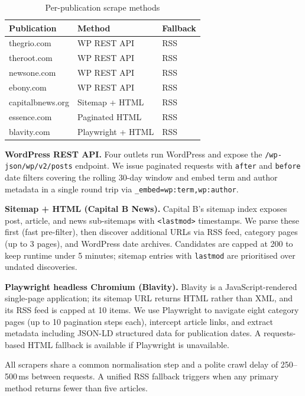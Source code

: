 \documentclass[sigconf,anonymous]{acmart}
\begin{document}
\begin{table}[h]
\caption{Per-publication scrape methods}
\label{tab:sources}
\small
\begin{tabular}{lll}
\toprule
\textbf{Publication} & \textbf{Method} & \textbf{Fallback} \\
\midrule
thegrio.com      & WP REST API       & RSS  \\
theroot.com      & WP REST API       & RSS  \\
newsone.com      & WP REST API       & RSS  \\
ebony.com        & WP REST API       & RSS  \\
capitalbnews.org & Sitemap + HTML    & RSS  \\
essence.com      & Paginated HTML    & RSS  \\
blavity.com      & Playwright + HTML & RSS  \\
\bottomrule
\end{tabular}
\end{table}

\noindent\textbf{WordPress REST API.}
Four outlets run WordPress and expose the \texttt{/wp-json/wp/v2/posts}
endpoint.
We issue paginated requests with \texttt{after} and \texttt{before} date
filters covering the rolling 30-day window and embed term and author metadata
in a single round trip via \texttt{\_embed=wp:term,wp:author}.

\noindent\textbf{Sitemap + HTML (Capital B News).}
Capital B's sitemap index exposes post, article, and news sub-sitemaps with
\texttt{<lastmod>} timestamps.
We parse these first (fast pre-filter), then discover additional URLs via RSS
feed, category pages (up to 3 pages), and WordPress date archives.
Candidates are capped at 200 to keep runtime under 5 minutes; sitemap entries
with \texttt{lastmod} are prioritised over undated discoveries.

\noindent\textbf{Playwright headless Chromium (Blavity).}
Blavity is a JavaScript-rendered single-page application; its sitemap URL
returns HTML rather than XML, and its RSS feed is capped at 10 items.
We use Playwright to navigate eight category pages (up to 10 pagination steps
each), intercept article links, and extract metadata including JSON-LD
structured data for publication dates.
A requests-based HTML fallback is available if Playwright is unavailable.

All scrapers share a common normalisation step and a polite crawl delay of
250--500\,ms between requests.
A unified RSS fallback triggers when any primary method returns fewer than
five articles.
\end{document}
